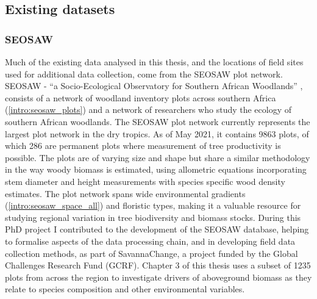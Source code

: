 \begin{refsection}
\subsection{Existing datasets}
\label{intro:ssec:existing_data}

\subsubsection{SEOSAW}
\label{intro:sssec:seosaw}

Much of the existing data analysed in this thesis, and the locations of field sites used for additional data collection, come from the SEOSAW plot network. SEOSAW - ``a Socio-Ecological Observatory for Southern African Woodlands'' \citep{Ryan2020}, consists of a network of woodland inventory plots across southern Africa (\autoref{intro:seosaw_plots}) and a network of researchers who study the ecology of southern African woodlands. The SEOSAW plot network currently represents the largest plot network in the dry tropics. As of May 2021, it contains 9863 plots, of which 286 are permanent plots where measurement of tree productivity is possible. The plots are of varying size and shape but share a similar methodology in the way woody biomass is estimated, using allometric equations incorporating stem diameter and height measurements with species specific wood density estimates. The plot network spans wide environmental gradients (\autoref{intro:seosaw_space_all}) and floristic types, making it a valuable resource for studying regional variation in tree biodiversity and biomass stocks. During this PhD project I contributed to the development of the SEOSAW database, helping to formalise aspects of the data processing chain, and in developing field data collection methods, as part of SavannaChange, a project funded by the Global Challenges Research Fund (GCRF). Chapter 3 of this thesis uses a subset of 1235 plots from across the region to investigate drivers of aboveground biomass as they relate to species composition and other environmental variables. 


\end{refsection}
